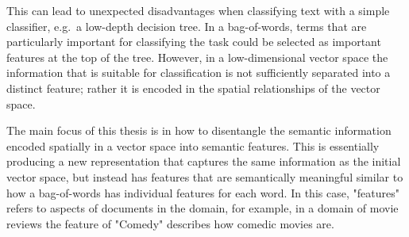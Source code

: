 This can lead to unexpected disadvantages when classifying text with a simple classifier, e.g.\ a low-depth decision tree. In a bag-of-words, terms that are particularly important for classifying the task could be selected as important features at the top of the tree. However, in a low-dimensional vector space the information that is suitable for classification is not sufficiently separated into a distinct feature; rather it is encoded in the spatial relationships of the vector space.%

The main focus of this thesis is in how to disentangle the semantic information encoded spatially in a vector space into semantic features. This is essentially producing a new representation that captures the same information as the initial vector space, but instead has features that are semantically meaningful similar to how a bag-of-words has individual features for each word.  In this case, "features" refers to aspects of documents in the domain, for example, in a domain of movie reviews the  feature of "Comedy"  describes how comedic movies are.


















